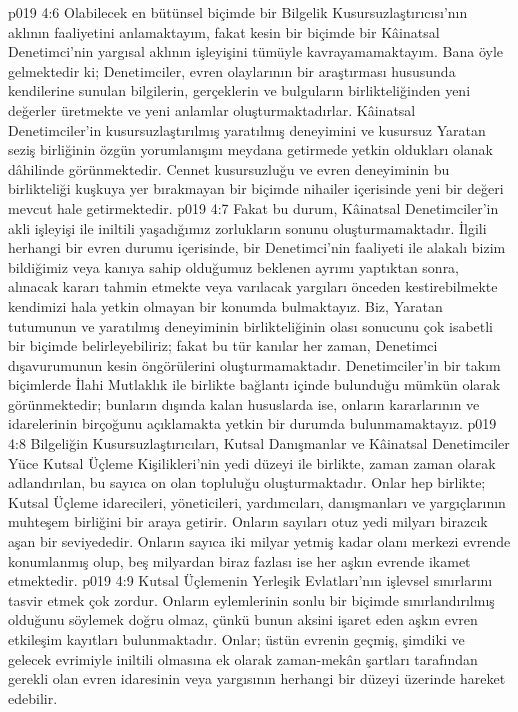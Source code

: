 \vs p019 4:6 Olabilecek en bütünsel biçimde bir Bilgelik Kusursuzlaştırıcısı’nın aklının faaliyetini anlamaktayım, fakat kesin bir biçimde bir Kâinatsal Denetimci’nin yargısal aklının işleyişini tümüyle kavrayamamaktayım. Bana öyle gelmektedir ki; Denetimciler, evren olaylarının bir araştırması hususunda kendilerine sunulan bilgilerin, gerçeklerin ve bulguların birlikteliğinden yeni değerler üretmekte ve yeni anlamlar oluşturmaktadırlar. Kâinatsal Denetimciler’in kusursuzlaştırılmış yaratılmış deneyimini ve kusursuz Yaratan seziş birliğinin özgün yorumlanışını meydana getirmede yetkin oldukları olanak dâhilinde görünmektedir. Cennet kusursuzluğu ve evren deneyiminin bu birlikteliği kuşkuya yer bırakmayan bir biçimde nihailer içerisinde yeni bir değeri mevcut hale getirmektedir.
\vs p019 4:7 Fakat bu durum, Kâinatsal Denetimciler’in akli işleyişi ile iniltili yaşadığımız zorlukların sonunu oluşturmamaktadır. İlgili herhangi bir evren durumu içerisinde, bir Denetimci’nin faaliyeti ile alakalı bizim bildiğimiz veya kanıya sahip olduğumuz beklenen ayrımı yaptıktan sonra, alınacak kararı tahmin etmekte veya varılacak yargıları önceden kestirebilmekte kendimizi hala yetkin olmayan bir konumda bulmaktayız. Biz, Yaratan tutumunun ve yaratılmış deneyiminin birlikteliğinin olası sonucunu çok isabetli bir biçimde belirleyebiliriz; fakat bu tür kanılar her zaman, Denetimci dışavurumunun kesin öngörülerini oluşturmamaktadır. Denetimciler’in bir takım biçimlerde İlahi Mutlaklık ile birlikte bağlantı içinde bulunduğu mümkün olarak görünmektedir; bunların dışında kalan hususlarda ise, onların kararlarının ve idarelerinin birçoğunu açıklamakta yetkin bir durumda bulunmamaktayız.
\vs p019 4:8 Bilgeliğin Kusursuzlaştırıcıları, Kutsal Danışmanlar ve Kâinatsal Denetimciler Yüce Kutsal Üçleme Kişilikleri’nin yedi düzeyi ile birlikte, zaman zaman olarak adlandırılan, bu sayıca on olan topluluğu oluşturmaktadır. Onlar hep birlikte; Kutsal Üçleme idarecileri, yöneticileri, yardımcıları, danışmanları ve yargıçlarının muhteşem birliğini bir araya getirir. Onların sayıları otuz yedi milyarı birazcık aşan bir seviyededir. Onların sayıca iki milyar yetmiş kadar olanı merkezi evrende konumlanmış olup, beş milyardan biraz fazlası ise her aşkın evrende ikamet etmektedir.
\vs p019 4:9 Kutsal Üçlemenin Yerleşik Evlatları’nın işlevsel sınırlarını tasvir etmek çok zordur. Onların eylemlerinin sonlu bir biçimde sınırlandırılmış olduğunu söylemek doğru olmaz, çünkü bunun aksini işaret eden aşkın evren etkileşim kayıtları bulunmaktadır. Onlar; üstün evrenin geçmiş, şimdiki ve gelecek evrimiyle iniltili olmasına ek olarak zaman\hyp{}mekân şartları tarafından gerekli olan evren idaresinin veya yargısının herhangi bir düzeyi üzerinde hareket edebilir.
